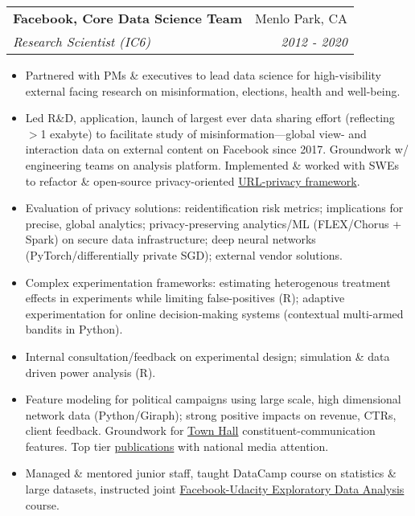 \documentclass[letterpaper,11pt]{article}
\makeatletter
\newcommand{\resitem}[1]{\item #1 \vspace{-6pt}}
\newcommand{\ressubheading}[4]{\vspace{2pt}
\begin{tabular*}{7.58in}{l@{\extracolsep{\fill}}r}
		\textbf{#1} & #2 \\
		\textit{#3} & \textit{#4} \\
\end{tabular*}\vspace{-1pt}}
\makeatother
\begin{document}
\ressubheading{Facebook, Core Data Science Team}{Menlo Park, CA}{Research Scientist (IC6)}{2012 - 2020}
	\begin{itemize}
       	 	\resitem{Partnered with PMs \& executives to lead data science for high-visibility external facing research on misinformation, elections, health and well-being.} 
		\resitem{Led R\&D, application, launch of largest ever data sharing effort (reflecting $>$1 exabyte) to facilitate study of misinformation---global view- and interaction data on external content on Facebook since 2017. Groundwork w/ engineering teams on analysis platform. Implemented \& worked with SWEs to refactor \& open-source privacy-oriented \href{https://github.com/facebookresearch/URL-Sanitization}{URL-privacy framework}.}
		\resitem{Evaluation of privacy solutions: reidentification risk metrics; implications for precise, global analytics; privacy-preserving analytics/ML (FLEX/Chorus + Spark) on secure data infrastructure; deep neural networks (PyTorch/differentially private SGD); external vendor solutions.}
		\resitem{Complex experimentation frameworks: estimating heterogenous treatment effects in experiments while limiting false-positives (R); adaptive experimentation for online decision-making systems (contextual multi-armed bandits in Python).}
		\resitem{Internal consultation/feedback on experimental design; simulation \& data driven power analysis (R).}
		\resitem{Feature modeling for political campaigns using large scale, high dimensional network data (Python/Giraph); strong positive impacts on revenue, CTRs, client feedback. Groundwork for \href{https://www.facebook.com/townhall/}{Town Hall} constituent-communication features. Top tier \href{https://dl.dropboxusercontent.com/u/25710348/Science-2015-Bakshy-1130-2.pdf}{publications} with national media attention. }
		\resitem{Managed \& mentored junior staff, taught DataCamp course on statistics \& large datasets, instructed joint \href{https://www.udacity.com/course/data-analysis-with-r--ud651}{Facebook-Udacity Exploratory Data Analysis} course.}
	\end{itemize}
\end{document}
